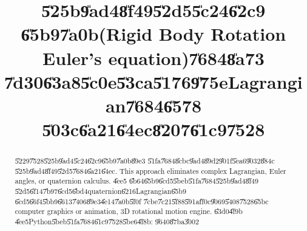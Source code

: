 \documentclass[12pt]{article}
\begin{document}
\title{\bigskip \textbf{\U{525b}\U{9ad4}\U{8f49}\U{52d5}\U{5c24}\U{62c9}%
\U{65b9}\U{7a0b}(Rigid Body Rotation Euler's equation)\U{7684}\U{8a73}%
\U{7d30}\U{63a8}\U{5c0e}\U{53ca}\U{5176}\U{975e}Lagrangian\U{7684}\U{6578}%
\U{503c}\U{6a21}\U{64ec}\U{8207}\U{61c9}\U{7528}}}
\author{}
\maketitle

\begin{abstract}
\U{5229}\U{7528}\U{525b}\U{9ad4}\U{5c24}\U{62c9}\U{65b9}\U{7a0b}\U{89e3}%
\U{51fa}\U{7684}\U{8cbc}\U{9ad4}\U{89d2}\U{901f}\U{5ea6}\U{9032}\U{884c}%
\U{525b}\U{9ad4}\U{8f49}\U{52d5}\U{7684}\U{6a21}\U{64ec}. This approach
eliminates complex Lagrangian, Euler angles, or quaternion calculus. \U{4ee5}%
\U{6b64}\U{65b9}\U{6cd5}\U{5beb}\U{51fa}\U{7684}\U{525b}\U{9ad4}\U{8f49}%
\U{52d5}\U{6f14}\U{7b97}\U{6cd5}\U{6bd4}quaternion\U{6216}Lagrangian\U{65b9}%
\U{6cd5}\U{66f4}\U{5bb9}\U{6613}\U{7406}\U{89e3}\U{4e14}\U{7a0b}\U{5f0f}%
\U{7cbe}\U{7c21}\U{5f88}\U{591a}\U{ff0c}\U{9069}\U{5408}\U{7528}\U{65bc}%
computer graphics or animation, 3D rotational motion engine. \U{63d0}\U{4f9b}%
\U{4ee5}Python\U{5beb}\U{51fa}\U{7684}\U{61c9}\U{7528}\U{5be6}\U{4f8b}: 
\U{9640}\U{87ba}\U{3002}
\end{abstract}
\end{document}
